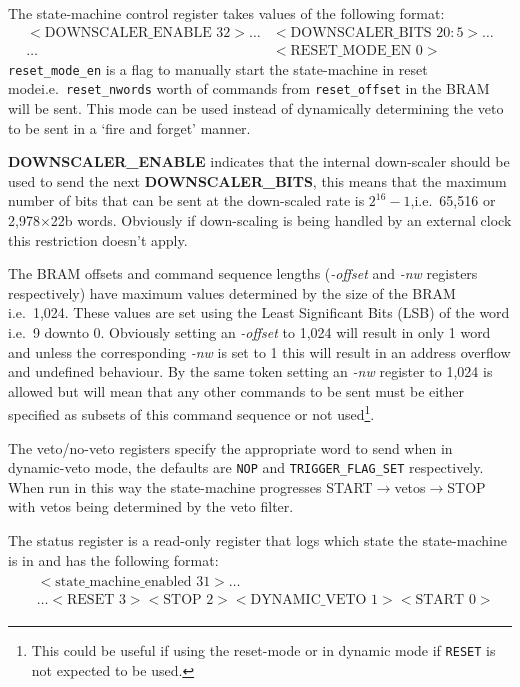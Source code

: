 The state-machine control register takes values of the following format:
\begin{equation} \label{fmt:control_reg}
    \begin{split}
      <\text{DOWNSCALER\_ENABLE } 32>\ldots&<\text{DOWNSCALER\_BITS } 20:5>\ldots\\
                                     \ldots&<\text{RESET\_MODE\_EN } 0>
    \end{split}
\end{equation}
\texttt{reset\_mode\_en} is a flag to manually start the state-machine in reset modei.e.\  \texttt{reset\_nwords} worth of commands from \texttt{reset\_offset} in the BRAM will be sent. This mode can be used instead of dynamically determining the veto to be sent in a `fire and forget' manner.

\textbf{DOWNSCALER\_ENABLE} indicates that the internal down-scaler should be used to send the next \textbf{DOWNSCALER\_BITS}, this means that the maximum number of bits that can be sent at the down-scaled rate is \(2^{16} - 1\),i.e.\  65,516 or 2,978\(\times\)22b words. Obviously if down-scaling is being handled by an external clock this restriction doesn't apply.

The BRAM offsets and command sequence lengths (\emph{-offset} and \emph{-nw} registers respectively) have maximum values determined by the size of the BRAM i.e.\ 1,024. These values are set using the Least Significant Bits (LSB) of the word i.e.\ 9 downto 0. Obviously setting an \emph{-offset} to 1,024 will result in only 1 word and unless the corresponding \emph{-nw} is set to 1 this will result in an address overflow and undefined behaviour. By the same token setting an \emph{-nw} register to 1,024 is allowed but will mean that any other commands to be sent must be either specified as subsets of this command sequence or not used\footnote{This could be useful if using the reset-mode or in dynamic mode if \texttt{RESET} is not expected to be used.}.
    
The veto/no-veto registers specify the appropriate word to send when in dynamic-veto mode, the defaults are \texttt{NOP} and \texttt{TRIGGER\_FLAG\_SET} respectively. When run in this way the state-machine progresses START\(\rightarrow\)vetos\(\rightarrow\)STOP with vetos being determined by the veto filter.
      
The status register is a read-only register that logs which state the state-machine is in and has the following format:
\begin{align} \label{fmt:status_reg}
  \begin{split}
    &<\text{state\_machine\_enabled } 31>\ldots                                          \\
    &\ldots<\text{RESET } 3> <\text{STOP } 2> <\text{DYNAMIC\_VETO } 1> <\text{START } 0> 
  \end{split}
\end{align}
	  

